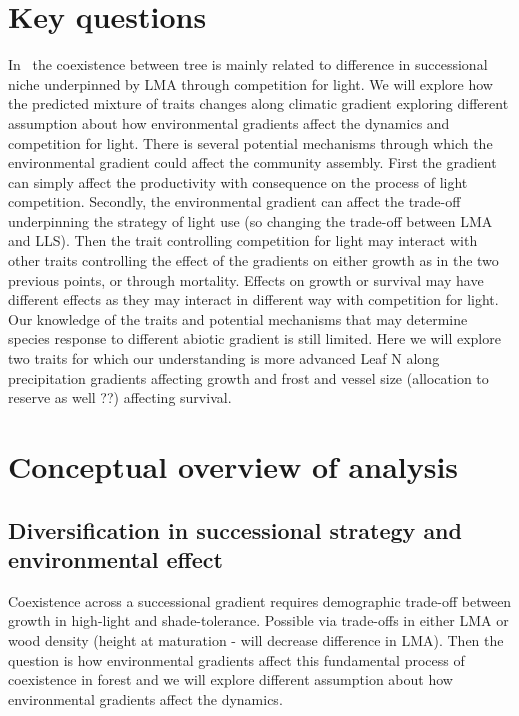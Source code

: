 \documentclass[a4paper,11pt]{article}
\begin{document}
\section{Key questions}

In \plant\ the coexistence between tree is mainly related to difference in successional niche underpinned by LMA through competition for light. We will explore how the predicted mixture of traits changes along climatic gradient exploring different assumption about how environmental gradients
affect the dynamics and competition for light. There is several
potential mechanisms through which the environmental gradient could
affect the community assembly. First the gradient can simply affect
the productivity with consequence on the process of light
competition. Secondly, the environmental gradient can affect the
trade-off underpinning the strategy of light use (so changing the
trade-off between LMA and LLS). Then the trait controlling competition
for light may interact with other traits controlling the effect of the
gradients on either growth as in the two previous points, or through
mortality. Effects on growth or survival may have different effects as
they may interact in different way with competition for light. Our knowledge of the traits and potential mechanisms that
may determine species response to different abiotic gradient is still
limited. Here we will explore two traits for which our understanding
is more advanced Leaf N along precipitation gradients affecting growth
and frost and vessel size (allocation to reserve as well ??) affecting
survival.

\section{Conceptual overview of analysis}

\subsection{Diversification in successional strategy and environmental effect}

Coexistence across a successional gradient requires demographic trade-off between growth in high-light and shade-tolerance. Possible via trade-offs in either LMA or wood density (height at maturation - will decrease difference in LMA). Then the question is how environmental gradients affect this fundamental process of coexistence in forest and we will explore different assumption about how environmental gradients
affect the dynamics.
\end{document}
